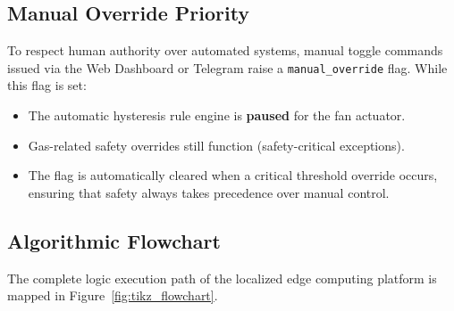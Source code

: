 \documentclass[12pt,a4paper]{report}
\begin{document}
\subsection{Manual Override Priority}
To respect human authority over automated systems, manual toggle commands issued via the Web Dashboard or Telegram raise a \texttt{manual\_override} flag. While this flag is set:
\begin{itemize}
    \item The automatic hysteresis rule engine is \textbf{paused} for the fan actuator.
    \item Gas-related safety overrides still function (safety-critical exceptions).
    \item The flag is automatically cleared when a critical threshold override occurs, ensuring that safety always takes precedence over manual control.
\end{itemize}

\subsection{Algorithmic Flowchart}
The complete logic execution path of the localized edge computing platform is mapped in Figure~\ref{fig:tikz_flowchart}.
\end{document}
